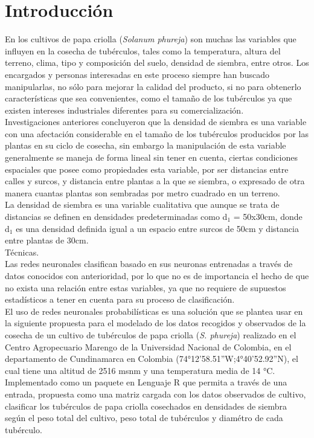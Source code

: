 

\chapter*{Introducci\'on}

En los cultivos de papa criolla (\textit{Solanum phureja}) son muchas las variables que influyen en la cosecha de tub\'erculos, tales como la temperatura, altura del terreno, clima, tipo y composici\'on del suelo, densidad de siembra, entre otros. Los encargados y personas interesadas en este proceso siempre han buscado manipularlas,  no sólo para mejorar la calidad del producto, si no para obtenerlo caracter\'isticas que sea convenientes, como el tama\~no de los tub\'erculos ya que existen intereses industriales diferentes para su comercializaci\'on.\\

Investigaciones anteriores concluyeron que la densidad de siembra es una variable con una afectaci\'on considerable en el tama\~no de los tub\'erculos producidos por las plantas en su ciclo de cosecha, sin embargo la manipulación de esta variable generalmente se maneja de forma lineal sin tener en cuenta, ciertas condiciones espaciales que posee como propiedades esta variable, por  ser distancias entre calles y surcos, y distancia entre plantas a la que se siembra, o expresado de otra manera cuantas plantas son sembradas por metro cuadrado en un terreno.\\

La densidad de siembra es una variable cualitativa que aunque se trata de distancias se definen en densidades predeterminadas como d$_1$ = 50x30cm, donde d$_1$ es una densidad definida igual a un espacio entre surcos de 50cm y distancia entre plantas de 30cm.\\



Técnicas.\\

 
Las redes neuronales clasifican basado en sus neuronas entrenadas a través de datos conocidos con anterioridad, por lo que no es de importancia el hecho de que no exista una relación entre estas variables, ya que no requiere de supuestos estad\'isticos a tener en cuenta para su proceso de clasificación.\\


El uso de redes neuronales probabil\'isticas es una soluci\'on que se plantea usar en la siguiente propuesta para el modelado de los datos recogidos y observados de la cosecha de un cultivo de tubérculos de papa criolla (\textit{S. phureja}) realizado en el Centro Agropecuario Marengo de la Universidad Nacional de Colombia, en el departamento de Cundinamarca en Colombia (74°12'58.51''W;4°40'52.92''N), el cual tiene una altitud de 2516 msnm y una temperatura media de 14 °C. Implementado como un paquete en Lenguaje R que permita a través de una entrada, propuesta como una matriz cargada con los datos observados de cultivo, clasificar los tub\'erculos de papa criolla cosechados en densidades de siembra seg\'un el peso total del cultivo, peso total de tub\'erculos y diam\'etro de cada tub\'erculo.\\


